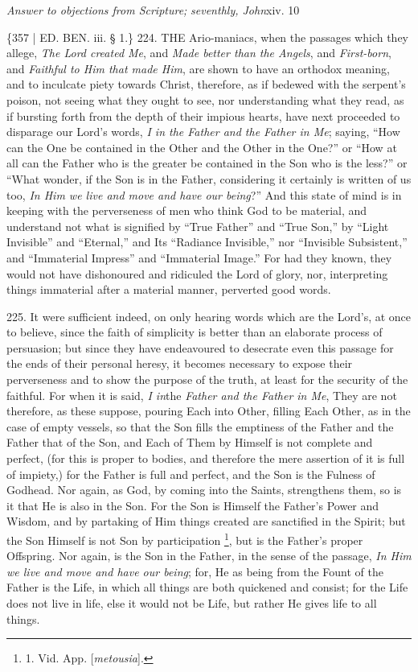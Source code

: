 \emph{Answer to objections from Scripture;}
\emph{seventhly, John}xiv. 10

\{357 | ED.
BEN. iii. § 1.\} 224. THE
Ario-maniacs, when the passages which they allege, \emph{The Lord created
Me}, and \emph{Made better than the Angels}, and \emph{First-born},
and \emph{Faithful to Him that made Him}, are shown to have an
orthodox meaning, and to inculcate piety towards Christ, therefore, as
if bedewed with the serpent's poison, not seeing what they ought to
see, nor understanding what they read, as if bursting forth from the
depth of their impious hearts, have next proceeded to disparage our
Lord's words, \emph{I in the Father and the Father in Me}; saying, ``How
can the One be contained in the Other and the Other in the One?'' or ``How
at all can the Father who is the greater be contained in the Son who
is the less?'' or ``What wonder, if the Son is in the Father,
considering it certainly is written of us too, \emph{In Him we live and
move and have our being}?'' And this state of mind is in keeping
with the perverseness of men who think God to be material, and
understand not what is signified by ``True Father'' and ``True Son,'' by ``Light
Invisible'' and ``Eternal,'' and Its ``Radiance Invisible,'' nor ``Invisible
Subsistent,'' and ``Immaterial Impress'' and ``Immaterial Image.'' For had
they known, they would not have dishonoured and ridiculed the Lord of
glory, nor, interpreting things immaterial after a material
manner, perverted good words.

225. It were
sufficient indeed, on only hearing words which are the Lord's, at once
to believe, since the faith of simplicity is better than an elaborate
process of persuasion; but since they have endeavoured to desecrate
even this passage for the ends of their personal heresy, it becomes
necessary to expose their perverseness and to show the purpose of the
truth, at least for the security of the faithful. For when it is said,
\emph{I in}the \emph{Father and the Father in Me}, They are not
therefore, as these suppose, pouring Each into Other, filling Each
Other, as in the case of empty vessels, so that the Son fills the
emptiness of the Father and the Father that of the Son, and Each of
Them by Himself is not complete and perfect, (for this is proper to
bodies, and therefore the mere assertion of it is full of impiety,)
for the Father is full and perfect, and the Son is the Fulness of
Godhead. Nor again, as God, by coming into the Saints, strengthens
them, so is it that He is also in the Son. For the Son is Himself the
Father's Power and Wisdom, and by partaking of Him things created are
sanctified in the Spirit; but the Son Himself is not Son by
participation \footnote{

1. Vid. App.
[\emph{metousia}].}, but is the
Father's proper Offspring. Nor again, is the Son in the Father, in the
sense of the passage, \emph{In Him we live and move and have our being};
for, He as being from the Fount of the Father is the Life, in which
all things are both quickened and consist; for the Life does not live
in life, else it would not be Life, but rather He gives life to all
things.

